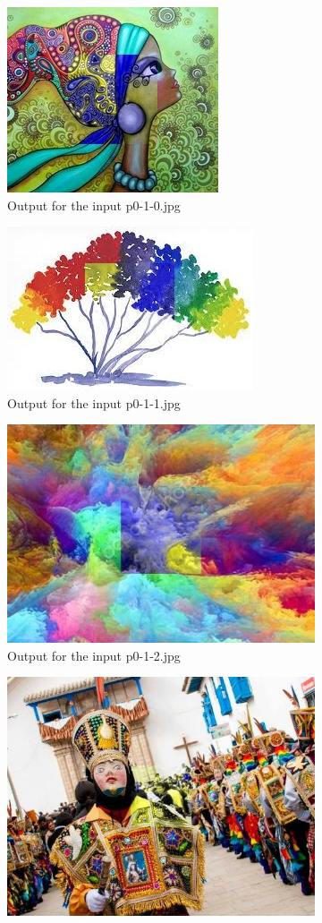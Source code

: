 \begin{enumerate}[label=\emph{\alph*)}]
\begin{figure}[h!]
\centering
\begin{subfigure}{0.5\textwidth}
  \centering
  \includegraphics[width=0.5\linewidth]{../output/p0-3-b-0.jpg}
  \caption{Output for the input p0-1-0.jpg}
  \label{fig:sfig1}
\end{subfigure}%
\begin{subfigure}{0.5\textwidth}
  \centering
  \includegraphics[width=0.5\linewidth]{../output/p0-3-b-1.jpg}
  \caption{Output for the input p0-1-1.jpg}
  \label{fig:sfig2}
\end{subfigure}
\begin{subfigure}{0.5\textwidth}
  \centering
  \includegraphics[width=0.5\linewidth]{../output/p0-3-b-2.jpg}
  \caption{Output for the input p0-1-2.jpg}
  \label{fig:sfig1}
\end{subfigure}%
\begin{subfigure}{0.5\textwidth}
  \centering
  \includegraphics[width=0.5\linewidth]{../output/p0-3-b-3.jpg}

\end{subfigure}
\end{figure}
\end{enumerate}
